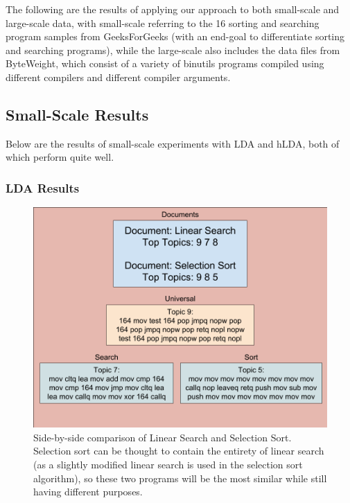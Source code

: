 The following are the results of applying our approach to both small-scale and large-scale data, with small-scale referring to the 16 sorting and searching program samples from GeeksForGeeks (with an end-goal to differentiate sorting and searching programs), while the large-scale also includes the data files from ByteWeight, which consist of a variety of binutils programs compiled using different compilers and different compiler arguments.

\subsection{Small-Scale Results}

Below are the results of small-scale experiments with LDA and hLDA, both of which perform quite well.

\subsubsection{LDA Results}

\begin{figure}
  \includegraphics[width=\linewidth]{./figures/ss_fig.png}
  \caption{Side-by-side comparison of Linear Search and Selection Sort. Selection sort can be thought to contain the entirety of linear search (as a slightly modified linear search is used in the selection sort algorithm), so these two programs will be the most similar while still having different purposes.}
  \label{fig:small_lda}
\end{figure}

